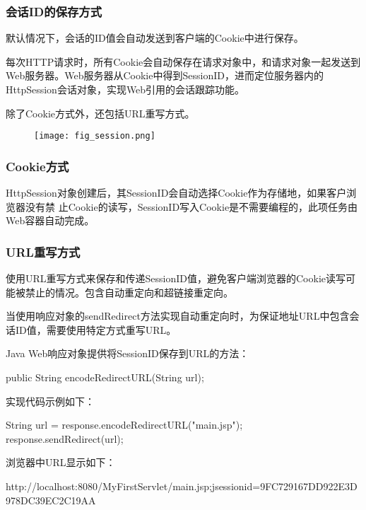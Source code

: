 \begin{frame}[fragile] %
\frametitle{会话ID的保存方式} 

默认情况下，会话的ID值会{\Red\hei 自动发送到客户端的Cookie中进行保存}。

{\kai 每次HTTP请求时，所有Cookie会自动保存在请求对象中，和请求对象一起发送到Web服务器。Web服务器从Cookie中得到SessionID，进而定位服务器内的HttpSession会话对象，实现Web引用的会话跟踪功能。}

除了Cookie方式外，还包括URL重写方式。

\begin{figure}
\centering
\texttt{[image: fig\_session.png]}
\end{figure}
\end{frame}

\begin{frame}[fragile] %
\frametitle{Cookie方式} 

HttpSession对象创建后，其{\hei SessionID会自动选择Cookie作为存储地}，如果客户浏览器没有禁
止Cookie的读写，SessionID写入Cookie是不需要编程的，此项任务由Web容器自动完成。
\end{frame}

\begin{frame}[fragile] %
\frametitle{URL重写方式} 

使用URL重写方式来保存和传递SessionID值，避免客户端浏览器的Cookie读写可能被禁止的情况。包含{\hei\Red 自动重定向和超链接重定向}。


当使用{\hei\Red 响应对象}的sendRedirect方法实现自动重定向时，为保证地址URL中包含会话ID值，需要使用特定方式重写URL。

Java Web响应对象提供将SessionID保存到URL的方法：

\begin{javaCode}
public String encodeRedirectURL(String url);  
\end{javaCode}

实现代码示例如下：
\begin{javaCode}
String url = response.encodeRedirectURL("main.jsp");
response.sendRedirect(url);
\end{javaCode}

浏览器中URL显示如下：
\begin{shCode}
http://localhost:8080/MyFirstServlet/main.jsp;jsessionid=9FC729167DD922E3D978DC39EC2C19AA  
\end{shCode}
\end{frame}

